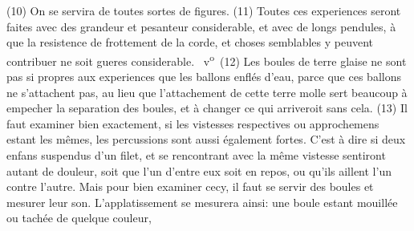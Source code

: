 (10) On se%
%
servira de toutes sortes de figures.
\pend 
%
\pstart
(11) Toutes ces experiences\protect{} seront faites avec des 
%
%
grandeur et pesanteur considerable, et avec de longs pendules,\protect{} à
%
%
que la resistence de
%
%
frottement\protect{} de la corde,\protect{} et choses semblables y peuvent contribuer ne soit gueres considerable.
\pend 
%
\pstart
{}~v\textsuperscript{o}\rbrack\
(12) Les boules de terre glaise\protect{}\protect{}
%
ne sont pas si propres aux experiences\protect{} que
%
les ballons enflés d'eau,\protect{} parce que ces ballons\protect{} ne s'attachent pas,
%
au lieu que l'attachement de cette terre molle\protect{} sert beaucoup à empecher
%
la separation des boules,\protect{} et à changer ce qui arriveroit sans cela.
\pend 
%
\pstart
(13) Il faut examiner bien exactement, si les vistesses respectives\protect{} ou approchemens estant
%
les mêmes, les percussions\protect{} sont aussi également fortes. 
%
C'est à dire si deux enfans suspendus d'un filet,\protect{} et se rencontrant avec la même vistesse 
%
sentiront autant de douleur,\protect{} soit que l'un d'entre eux soit en repos, ou qu'ils aillent l'un contre l'autre. 
%
Mais pour bien examiner cecy, il faut se servir des boules\protect{} et mesurer 
%
%
leur son.
%
L'applatissement\protect{} se mesurera ainsi:
%
une boule\protect{} estant mouillée ou tachée de quelque couleur, 
